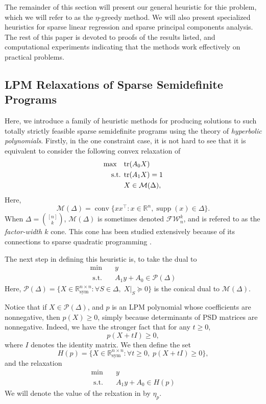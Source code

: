 \documentclass{amsart}
\theoremstyle{definition}
\newcommand{\R}{\mathbb{R}}
\newcommand{\tr}{\textup{tr}}
\newcommand{\FW}{\mathcal{F}\mathcal{W}}
\renewcommand{\P}{\mathcal{P}}
\newcommand{\M}{\mathcal{M}}
\DeclareMathOperator*{\supp}{supp}
\newcommand{\st}{{\text{ s.t. }}}
\DeclareMathOperator{\conv}{\operatorname{conv}}
\newcommand*{\Sym}{\R^{n \times n}_{\mathrm{sym}}}
\begin{document}
The remainder of this section will present our general heuristic for thie problem, which we will refer to as the $\eta$-greedy method.
We will also present specialized heuristics for sparse linear regression and sparse principal components analysis.
The rest of this paper is devoted to proofs of the results listed, and computational experiments indicating that the methods work effectively on practical problems.

\subsection{LPM Relaxations of Sparse Semidefinite Programs}
Here, we introduce a family of heuristic methods for producing solutions to such totally strictly feasible sparse semidefinite programs using the theory of \emph{hyperbolic polynomials}.
Firstly, in the one constraint case, it is not hard to see that it is equivalent to consider the following convex relaxation of 
\begin{equation}\label{eq:sparse_sdp}
    \begin{aligned}
        \max\quad & \tr(A_0X)\\
        \st & \tr(A_1X) = 1\\
            & X \in \M(\Delta),
    \end{aligned}
\end{equation}
Here, 
\[
    \M(\Delta) = \conv \{xx^{\intercal} : x \in \R^n, \supp(x) \in \Delta\}.
\]
When $\Delta = \binom{[n]}{k}$, $\M(\Delta)$ is sometimes denoted $\FW^k_n$, and is refered to as the \emph{factor-width $k$} cone. This cone has been studied extensively because of its connections to sparse quadratic programming \cite{TODO}.

The next step in defining this heuristic is, to take the dual to 
\begin{equation}\label{eq:sparse_sdp_dual}
    \begin{aligned}
        \min\quad & y\\
        \st & A_1y + A_0 \in \P(\Delta)
    \end{aligned}
\end{equation}
Here, $\P(\Delta) = \{X \in \Sym : \forall S \in \Delta,\;X|_S \succeq 0\}$ is the conical dual to $\M(\Delta)$.

Notice that if $X \in \P(\Delta)$, and $p$ is an LPM polynomial whose coefficients are nonnegative, then $p(X) \ge 0$, simply because determinants of PSD matrices are nonnegative.
Indeed, we have the stronger fact that for any $t \ge 0$, 
\[
    p(X + tI) \ge 0,
\]
where $I$ denotes the identity matrix.
We then define the set 
\[
    H(p) = \{X \in \Sym : \forall t \ge 0,\; p(X+tI) \ge 0\},
\]
and the relaxation
\begin{equation}\label{eq:relaxation}
    \begin{aligned}
        \min\quad & y\\
        \st & A_1y + A_0 \in H(p)
    \end{aligned}
\end{equation}
We will denote the value of the relxation in  by $\eta_p$.
\end{document}
